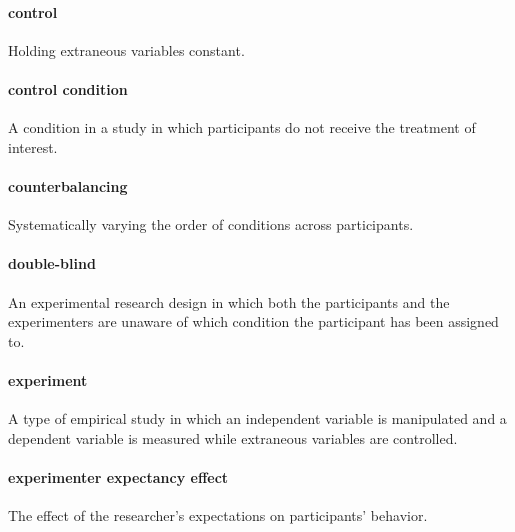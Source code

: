 \documentclass[
]{krantz}
\begin{document}
\paragraph*{control}\label{control}

Holding extraneous variables constant.

\paragraph*{control condition}\label{control-condition}

A condition in a study in which participants do not receive the treatment of interest.

\paragraph*{counterbalancing}\label{counterbalancing}

Systematically varying the order of conditions across participants.

\paragraph*{double-blind}\label{double-blind}

An experimental research design in which both the participants and the experimenters are unaware of which condition the participant has been assigned to.

\paragraph*{experiment}\label{experiment-1}

A type of empirical study in which an independent variable is manipulated and a dependent variable is measured while extraneous variables are controlled.

\paragraph*{experimenter expectancy effect}\label{experimenter-expectancy-effect}

The effect of the researcher's expectations on participants' behavior.
\end{document}
